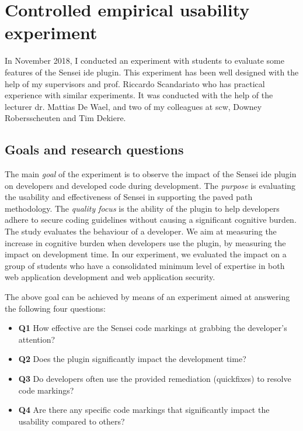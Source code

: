 \section{Controlled empirical usability experiment}
\label{sec:experiment}

In November 2018, I conducted an experiment with students to evaluate some features of the Sensei \gls{ide} plugin.
This experiment has been well designed with the help of my supervisors and prof. Riccardo Scandariato who has practical experience with similar experiments.
It was conducted with the help of the lecturer dr. Mattias De Wael, and two of my colleagues at \gls{scw}, Downey Robersscheuten and Tim Dekiere.

\subsection{Goals and research questions}
The main \textit{goal} of the experiment is to observe the impact of the Sensei \gls{ide} plugin on developers and developed code during development.
The \textit{purpose} is evaluating the usability and effectiveness of Sensei in supporting the paved path methodology.
The \textit{quality focus} is the ability of the plugin to help developers adhere to secure coding guidelines without causing a significant cognitive burden.
The study evaluates the behaviour of a developer.
We aim at measuring the increase in cognitive burden when developers use the plugin, by measuring the impact on development time.
In our experiment, we evaluated the impact on a group of students who have a consolidated minimum level of expertise in both web application development and web application security.

The above goal can be achieved by means of an experiment aimed at answering the following four questions:
\begin{itemize}
    \item \textbf{Q1} How effective are the Sensei code markings at grabbing the developer's attention?
    \item \textbf{Q2} Does the plugin significantly impact the development time?
    \item \textbf{Q3} Do developers often use the provided remediation (quickfixes) to resolve code markings?
    \item \textbf{Q4} Are there any specific code markings that significantly impact the usability compared to others?
\end{itemize}

